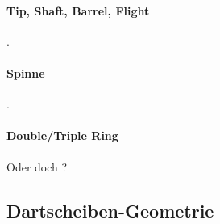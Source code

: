 \paragraph{Tip, Shaft, Barrel, Flight}

.

\paragraph{Spinne}

.

\paragraph{Double/Triple Ring}

Oder doch ?


\subsection{Dartscheiben-Geometrie}
\label{sec:dartscheiben_geometrie}

